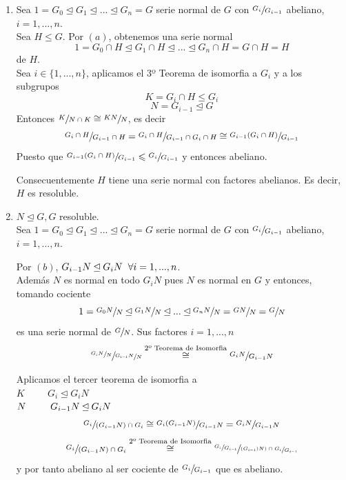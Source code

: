 \documentclass[11pt,a4paper]{article}
\begin{document}
\begin{enumerate}[label = \arabic*)]
\item Sea $1 = G_{0} \unlhd G_{1} \unlhd ... \unlhd G_{n} = G$ serie normal de $G$ con $\sfrac{G_{i}}{G_{i-1}}$ abeliano, $i = 1, ..., n$. \\
Sea $H \leqslant G$. Por $(a)$, obtenemos una serie normal
$$1 = G_{0} \cap H \unlhd G_{1} \cap H \unlhd ... \unlhd G_{n} \cap H = G \cap H = H$$
de $H$. \\
Sea $i \in \{1, ..., n\}$, aplicamos el 3º Teorema de isomorfia a $G_{i}$ y a los subgrupos
$$K = G_{i} \cap H \leqslant G_{i}$$
$$N = G_{i-1} \unlhd G$$
Entonces $\sfrac{K}{N \cap K} \cong \sfrac{KN}{N}$, es decir
$$\sfrac{G_{i} \cap H}{G_{i-1} \cap H} = \sfrac{G_{i} \cap H}{G_{i-1} \cap G_{i} \cap H} \cong \sfrac{G_{i-1}(G_{i} \cap H)}{G_{i-1}}$$
Puesto que $\sfrac{G_{i-1}(G_{i} \cap H)}{G_{i-1}} \leqslant \sfrac{G_{i}}{G_{i-1}}$ y entonces abeliano.

Consecuentemente $H$ tiene una serie normal con factores abelianos. Es decir, $H$ es resoluble.
\item $N \unlhd G, G$ resoluble. \\
Sea $1 = G_{0} \unlhd G_{1} \unlhd ... \unlhd G_{n} = G$ serie normal de $G$ con $\sfrac{G_{i}}{G_{i-1}}$ abeliano, $i = 1, ..., n$.

Por $(b)$, $G_{i-1}N \unlhd G_{i} N \hspace{0.2cm} \forall i = 1, ..., n$. \\
Además $N$ es normal en todo $G_{i}N$ pues $N$ es normal en $G$ y entonces, tomando cociente
$$1 = \sfrac{G_{0}N}{N} \unlhd \sfrac{G_{1}N}{N} \unlhd ... \unlhd \sfrac{G_{n}N}{N} = \sfrac{GN}{N} = \sfrac{G}{N}$$
es una serie normal de $\sfrac{G}{N}$. Sus factores $i = 1, ..., n$
$$\sfrac{\sfrac{G_{i}N}{N}}{\sfrac{G_{i-1}N}{N}} \overset{\text{2º Teorema de Isomorfia}}{\cong} \sfrac{G_{i}N}{G_{i-1}N}$$

Aplicamos el tercer teorema de isomorfia a \\
$K \hspace{1cm} G_{i} \unlhd G_{i}N$ \\
$N \hspace{0.9cm}G_{i-1}N \unlhd G_{i}N$
$$\sfrac{G_{i}}{(G_{i-1}N) \cap G_{i}} \cong \sfrac{G_{i}(G_{i-1}N)}{G_{i-1}N} = \sfrac{G_{i}N}{G_{i-1}N}$$
$$\sfrac{G_{i}}{(G_{i-1}N) \cap G_{i}} \overset{\text{2º Teorema de Isomorfia}}{\cong} \sfrac{\sfrac{G_{i}}{G_{i-1}}}{\sfrac{(G_{i-1})N) \cap G_{i}}{G_{i-1}}}$$
y por tanto abeliano al ser cociente de $\sfrac{G_{i}}{G_{i-1}}$ que es abeliano.


\end{enumerate}
\end{document}
